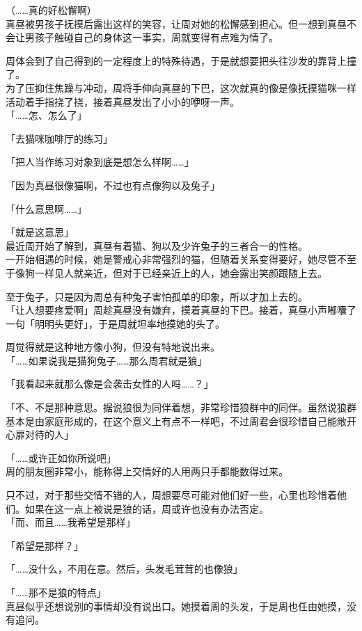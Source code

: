 （……真的好松懈啊）\\

真昼被男孩子抚摸后露出这样的笑容，让周对她的松懈感到担心。但一想到真昼不会让男孩子触碰自己的身体这一事实，周就变得有点难为情了。

周体会到了自己得到的一定程度上的特殊待遇，于是就想要把头往沙发的靠背上撞了。\\

为了压抑住焦躁与冲动，周将手伸向真昼的下巴，这次就真的像是像抚摸猫咪一样活动着手指挠了挠，接着真昼发出了小小的咿呀一声。\\

「……怎、怎么了」

「去猫咪咖啡厅的练习」

「把人当作练习对象到底是想怎么样啊……」

「因为真昼很像猫啊，不过也有点像狗以及兔子」

「什么意思啊……」

「就是这意思」\\

最近周开始了解到，真昼有着猫、狗以及少许兔子的三者合一的性格。\\

一开始相遇的时候，她是警戒心非常强烈的猫，但随着关系变得要好，她尽管不至于像狗一样见人就亲近，但对于已经亲近上的人，她会露出笑颜跟随上去。

至于兔子，只是因为周总有种兔子害怕孤单的印象，所以才加上去的。\\

「让人想要疼爱啊」周趁真昼没有嫌弃，摸着真昼的下巴。接着，真昼小声嘟囔了一句「明明头更好」，于是周就坦率地摸她的头了。

周觉得就是这种地方像小狗，但没有特地说出来。\\

「……如果说我是猫狗兔子……那么周君就是狼」

「我看起来就那么像是会袭击女性的人吗……？」

「不、不是那种意思。据说狼很为同伴着想，非常珍惜狼群中的同伴。虽然说狼群基本是由家庭形成的，在这个意义上有点不一样吧，不过周君会很珍惜自己能敞开心扉对待的人」

「……或许正如你所说吧」\\

周的朋友圈非常小，能称得上交情好的人用两只手都能数得过来。

只不过，对于那些交情不错的人，周想要尽可能对他们好一些，心里也珍惜着他们。如果在这一点上被说是狼的话，周或许也没有办法否定。\\

「而、而且……我希望是那样」

「希望是那样？」

「……没什么，不用在意。然后，头发毛茸茸的也像狼」

「……那不是狼的特点」\\

真昼似乎还想说别的事情却没有说出口。她摸着周的头发，于是周也任由她摸，没有追问。
